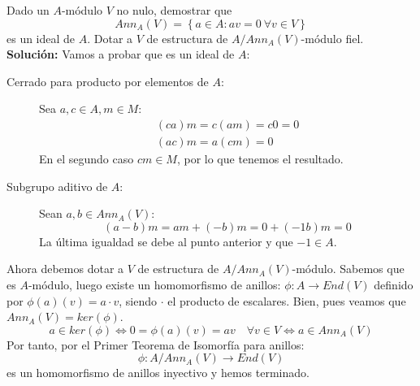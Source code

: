 \begin{ejercicio}
    Dado un $A$-módulo $V$ no nulo, demostrar que
    \begin{equation*}
        Ann_A(V) = \left\{a \in A : av = 0 \ \forall v \in V\right\}
    \end{equation*}
        es un ideal de $A$. Dotar a $V$ de estructura de $A \slash Ann_A(V)$-módulo fiel. \\
        
    \noindent
    \textbf{Solución:}
    Vamos a probar que es un ideal de $A$:
    \begin{description}
        \item [Cerrado para producto por elementos de $A$:] Sea $a, c \in A, m \in M$:
            \begin{gather*}
                (ca)m = c(am) = c0 = 0 \\
                (ac)m = a(cm) = 0
            \end{gather*}
            En el segundo caso $cm \in M$, por lo que tenemos el resultado.
        \item [Subgrupo aditivo de $A$:] Sean $a, b \in Ann_A(V)$:
            \begin{equation*}
                (a-b)m = am + (-b)m = 0 + (-1b)m = 0
            \end{equation*}
            La última igualdad se debe al punto anterior y que $-1 \in A$.
    \end{description}

    Ahora debemos dotar a $V$ de estructura de $A/Ann_A(V)$-módulo. Sabemos que es $A$-módulo, luego existe un homomorfismo de anillos: $\phi:A \to End(V)$ definido por $\phi(a)(v) = a\cdot v$, siendo $\cdot$ el producto de escalares. Bien, pues veamos que $Ann_A(V)= ker(\phi)$. 
    \begin{equation*}
        a \in ker(\phi) \Longleftrightarrow 0 = \phi(a)(v) = av \quad \forall v \in V \Longleftrightarrow a \in Ann_A(V)
    \end{equation*}
    Por tanto, por el Primer Teorema de Isomorfía para anillos:
    \begin{equation*}
        \phi:A/Ann_A(V) \to End(V)
    \end{equation*}
    es un homomorfismo de anillos inyectivo y hemos terminado. 
        
\end{ejercicio}

